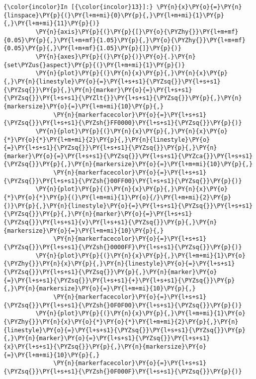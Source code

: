    \begin{Verbatim}[commandchars=\\\{\}]
{\color{incolor}In [{\color{incolor}13}]:} \PY{n}{x}\PY{o}{=}\PY{n}{linspace}\PY{p}{(}\PY{l+m+mi}{0}\PY{p}{,}\PY{l+m+mi}{1}\PY{p}{,}\PY{l+m+mi}{11}\PY{p}{)}
         \PY{n}{axis}\PY{p}{(}\PY{p}{[}\PY{o}{\PYZhy{}}\PY{l+m+mf}{0.05}\PY{p}{,}\PY{l+m+mf}{1.05}\PY{p}{,}\PY{o}{\PYZhy{}}\PY{l+m+mf}{0.05}\PY{p}{,}\PY{l+m+mf}{1.05}\PY{p}{]}\PY{p}{)}
         \PY{n}{axes}\PY{p}{(}\PY{p}{)}\PY{o}{.}\PY{n}{set\PYZus{}aspect}\PY{p}{(}\PY{l+m+mi}{1}\PY{p}{)}
         \PY{n}{plot}\PY{p}{(}\PY{n}{x}\PY{p}{,}\PY{n}{x}\PY{p}{,}\PY{n}{linestyle}\PY{o}{=}\PY{l+s+s1}{\PYZsq{}}\PY{l+s+s1}{\PYZsq{}}\PY{p}{,}\PY{n}{marker}\PY{o}{=}\PY{l+s+s1}{\PYZsq{}}\PY{l+s+s1}{\PYZlt{}}\PY{l+s+s1}{\PYZsq{}}\PY{p}{,}\PY{n}{markersize}\PY{o}{=}\PY{l+m+mi}{10}\PY{p}{,}
              \PY{n}{markerfacecolor}\PY{o}{=}\PY{l+s+s1}{\PYZsq{}}\PY{l+s+s1}{\PYZsh{}FF0000}\PY{l+s+s1}{\PYZsq{}}\PY{p}{)}
         \PY{n}{plot}\PY{p}{(}\PY{n}{x}\PY{p}{,}\PY{n}{x}\PY{o}{*}\PY{o}{*}\PY{l+m+mi}{2}\PY{p}{,}\PY{n}{linestyle}\PY{o}{=}\PY{l+s+s1}{\PYZsq{}}\PY{l+s+s1}{\PYZsq{}}\PY{p}{,}\PY{n}{marker}\PY{o}{=}\PY{l+s+s1}{\PYZsq{}}\PY{l+s+s1}{\PYZca{}}\PY{l+s+s1}{\PYZsq{}}\PY{p}{,}\PY{n}{markersize}\PY{o}{=}\PY{l+m+mi}{10}\PY{p}{,}
              \PY{n}{markerfacecolor}\PY{o}{=}\PY{l+s+s1}{\PYZsq{}}\PY{l+s+s1}{\PYZsh{}00FF00}\PY{l+s+s1}{\PYZsq{}}\PY{p}{)}
         \PY{n}{plot}\PY{p}{(}\PY{n}{x}\PY{p}{,}\PY{n}{x}\PY{o}{*}\PY{o}{*}\PY{p}{(}\PY{l+m+mi}{1}\PY{o}{/}\PY{l+m+mi}{2}\PY{p}{)}\PY{p}{,}\PY{n}{linestyle}\PY{o}{=}\PY{l+s+s1}{\PYZsq{}}\PY{l+s+s1}{\PYZsq{}}\PY{p}{,}\PY{n}{marker}\PY{o}{=}\PY{l+s+s1}{\PYZsq{}}\PY{l+s+s1}{v}\PY{l+s+s1}{\PYZsq{}}\PY{p}{,}\PY{n}{markersize}\PY{o}{=}\PY{l+m+mi}{10}\PY{p}{,}
              \PY{n}{markerfacecolor}\PY{o}{=}\PY{l+s+s1}{\PYZsq{}}\PY{l+s+s1}{\PYZsh{}0000FF}\PY{l+s+s1}{\PYZsq{}}\PY{p}{)}
         \PY{n}{plot}\PY{p}{(}\PY{n}{x}\PY{p}{,}\PY{l+m+mi}{1}\PY{o}{\PYZhy{}}\PY{n}{x}\PY{p}{,}\PY{n}{linestyle}\PY{o}{=}\PY{l+s+s1}{\PYZsq{}}\PY{l+s+s1}{\PYZsq{}}\PY{p}{,}\PY{n}{marker}\PY{o}{=}\PY{l+s+s1}{\PYZsq{}}\PY{l+s+s1}{+}\PY{l+s+s1}{\PYZsq{}}\PY{p}{,}\PY{n}{markersize}\PY{o}{=}\PY{l+m+mi}{10}\PY{p}{,}
              \PY{n}{markerfacecolor}\PY{o}{=}\PY{l+s+s1}{\PYZsq{}}\PY{l+s+s1}{\PYZsh{}0F0F00}\PY{l+s+s1}{\PYZsq{}}\PY{p}{)}
         \PY{n}{plot}\PY{p}{(}\PY{n}{x}\PY{p}{,}\PY{l+m+mi}{1}\PY{o}{\PYZhy{}}\PY{n}{x}\PY{o}{*}\PY{o}{*}\PY{l+m+mi}{2}\PY{p}{,}\PY{n}{linestyle}\PY{o}{=}\PY{l+s+s1}{\PYZsq{}}\PY{l+s+s1}{\PYZsq{}}\PY{p}{,}\PY{n}{marker}\PY{o}{=}\PY{l+s+s1}{\PYZsq{}}\PY{l+s+s1}{x}\PY{l+s+s1}{\PYZsq{}}\PY{p}{,}\PY{n}{markersize}\PY{o}{=}\PY{l+m+mi}{10}\PY{p}{,}
              \PY{n}{markerfacecolor}\PY{o}{=}\PY{l+s+s1}{\PYZsq{}}\PY{l+s+s1}{\PYZsh{}0F000F}\PY{l+s+s1}{\PYZsq{}}\PY{p}{)}
\end{Verbatim}

